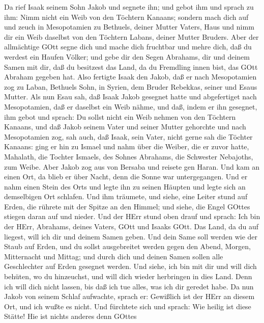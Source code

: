  Da rief Isaak seinem Sohn Jakob und segnete ihn; und gebot
ihm und sprach zu ihm: Nimm nicht ein Weib von den Töchtern Kanaans;
 sondern mach dich auf und zeuch in Mesopotamien zu
Bethuels, deiner Mutter Vaters, Haus und nimm dir ein Weib daselbst von
den Töchtern Labans, deiner Mutter Bruders.  Aber der
allmächtige GOtt segne dich und mache dich fruchtbar und mehre dich, daß
du werdest ein Haufen Völker;  und gebe dir den Segen
Abrahams, dir und deinem Samen mit dir, daß du besitzest das Land, da du
Fremdling innen bist, das GOtt Abraham gegeben hat.  Also
fertigte Isaak den Jakob, daß er nach Mesopotamien zog zu Laban,
Bethuels Sohn, in Syrien, dem Bruder Rebekkas, seiner und Esaus Mutter.
 Als nun Esau sah, daß Isaak Jakob gesegnet hatte und
abgefertiget nach Mesopotamien, daß er daselbst ein Weib nähme, und daß,
indem er ihn gesegnet, ihm gebot und sprach: Du sollst nicht ein Weib
nehmen von den Töchtern Kanaans,  und daß Jakob seinem Vater
und seiner Mutter gehorchte und nach Mesopotamien zog,  sah
auch, daß Isaak, sein Vater, nicht gerne sah die Töchter Kanaans:
 ging er hin zu Ismael und nahm über die Weiber, die er
zuvor hatte, Mahalath, die Tochter Ismaels, des Sohnes Abrahams, die
Schwester Nebajoths, zum Weibe.  Aber Jakob zog aus von
Bersaba und reisete gen Haran.  Und kam an einen Ort, da
blieb er über Nacht, denn die Sonne war untergegangen. Und er nahm einen
Stein des Orts und legte ihn zu seinen Häupten und legte sich an
demselbigen Ort schlafen.  Und ihm träumete, und siehe,
eine Leiter stund auf Erden, die rührete mit der Spitze an den Himmel;
und siehe, die Engel GOttes stiegen daran auf und nieder. 
Und der HErr stund oben drauf und sprach: Ich bin der HErr, Abrahams,
deines Vaters, GOtt und Isaaks GOtt. Das Land, da du auf liegest, will
ich dir und deinem Samen geben.  Und dein Same soll werden
wie der Staub auf Erden, und du sollst ausgebreitet werden gegen den
Abend, Morgen, Mitternacht und Mittag; und durch dich und deinen Samen
sollen alle Geschlechter auf Erden gesegnet werden.  Und
siehe, ich bin mit dir und will dich behüten, wo du hinzeuchst, und will
dich wieder herbringen in dies Land. Denn ich will dich nicht lassen,
bis daß ich tue alles, was ich dir geredet habe.  Da nun
Jakob von seinem Schlaf aufwachte, sprach er: Gewißlich ist der HErr an
diesem Ort, und ich wußte es nicht.  Und fürchtete sich und
sprach: Wie heilig ist diese Stätte! Hie ist nichts anderes denn GOttes
